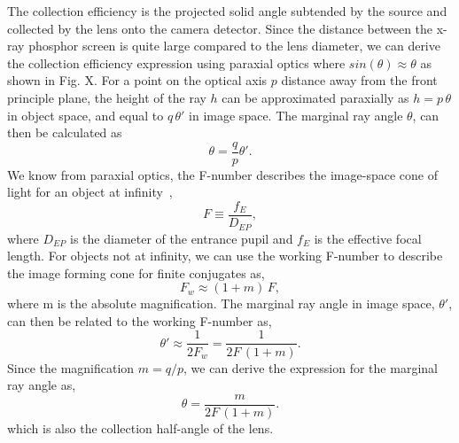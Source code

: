The collection efficiency is the projected solid angle subtended by the source and collected by the lens onto the camera detector.  Since the distance between the x-ray phosphor screen is quite large compared to the lens diameter, we can derive the collection efficiency expression using paraxial optics where $sin (\theta) \approx \theta$ as shown in Fig. X.  For a point on the optical axis $p$ distance away from the front principle plane, the height of the ray $h$ can be approximated paraxially as $h = p \, \theta$ in object space, and equal to $q \, \theta'$ in image space.  The marginal ray angle $\theta$, can then be calculated as
%
\begin{equation}
\theta = \frac{q}{p} \theta'.
\end{equation}
%
We know from paraxial optics, the F-number describes the image-space cone of light for an object at infinity~\citep{greivenkampfieldguide},
%
\begin{equation}
F \equiv \frac{f_E}{D_{EP}},
\end{equation}
%
where $D_{EP}$ is the diameter of the entrance pupil and $f_E$ is the effective focal length.  For objects not at infinity, we can use the working F-number to describe the image forming cone for finite conjugates as,
%
\begin{equation}
F_{w} \approx (1 + m) \, F,
\end{equation}
%
where m is the absolute magnification.  The marginal ray angle in image space, $\theta'$, can then be related to the working F-number as,
%
\begin{equation}
\theta' \approx \frac{1}{2 F_{w}} = \frac{1}{2 F \, (1+m)}.
\end{equation}
%
Since the magnification $m = q/p$, we can derive the expression for the marginal ray angle as,
%
\begin{equation}
\theta = \frac{m}{2 F \, (1+m)}.
\label{eqn:marginal_ray_angle}
\end{equation}
%
which is also the collection half-angle of the lens.  

